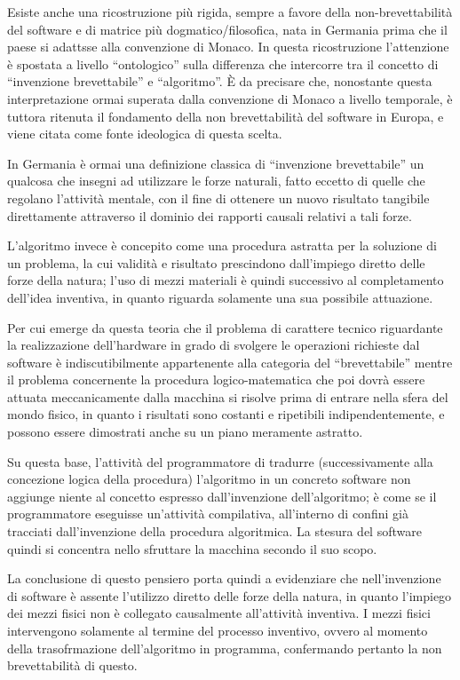 Esiste anche una ricostruzione più rigida, sempre a favore della non-brevettabilità del software e di matrice più dogmatico/filosofica, nata in Germania prima che il paese si adattsse alla convenzione di Monaco. In questa ricostruzione l'attenzione è spostata a livello ``ontologico'' sulla differenza che intercorre tra il concetto di ``invenzione brevettabile'' e ``algoritmo''. \`E da precisare che, nonostante questa interpretazione ormai superata dalla convenzione di Monaco a livello temporale, è tuttora ritenuta il fondamento della non brevettabilità del software in Europa, e viene citata come fonte ideologica di questa scelta.

In Germania è ormai una definizione classica di ``invenzione brevettabile'' un qualcosa che insegni ad utilizzare le forze naturali, fatto eccetto di quelle che regolano l'attività mentale, con il fine di ottenere un nuovo risultato tangibile direttamente attraverso il dominio dei rapporti causali relativi a tali forze.

L'algoritmo invece è concepito come una procedura astratta per la soluzione di un problema, la cui validità e risultato prescindono dall'impiego diretto delle forze della natura; l'uso di mezzi materiali è quindi successivo al completamento dell'idea inventiva, in quanto riguarda solamente una sua possibile attuazione.

Per cui emerge da questa teoria che il problema di carattere tecnico riguardante la realizzazione dell'hardware in grado di svolgere le operazioni richieste dal software è indiscutibilmente appartenente alla categoria del ``brevettabile'' mentre il problema concernente la procedura logico-matematica che poi dovrà essere attuata meccanicamente dalla macchina si risolve prima di entrare nella sfera del mondo fisico, in quanto i risultati sono costanti e ripetibili indipendentemente, e possono essere dimostrati anche su un piano meramente astratto.

Su questa base, l'attività del programmatore di tradurre (successivamente alla concezione logica della procedura) l'algoritmo in un concreto software non aggiunge niente al concetto espresso dall'invenzione dell'algoritmo; è come se il programmatore eseguisse un'attività compilativa, all'interno di confini già tracciati dall'invenzione della procedura algoritmica. La stesura del software quindi si concentra nello sfruttare la macchina secondo il suo scopo.

La conclusione di questo pensiero porta quindi a evidenziare che nell'invenzione di software è assente l'utilizzo diretto delle forze della natura, in quanto l'impiego dei mezzi fisici non è collegato causalmente all'attività inventiva. I mezzi fisici intervengono solamente al termine del processo inventivo, ovvero al momento della trasofrmazione dell'algoritmo in programma, confermando pertanto la non brevettabilità di questo.

